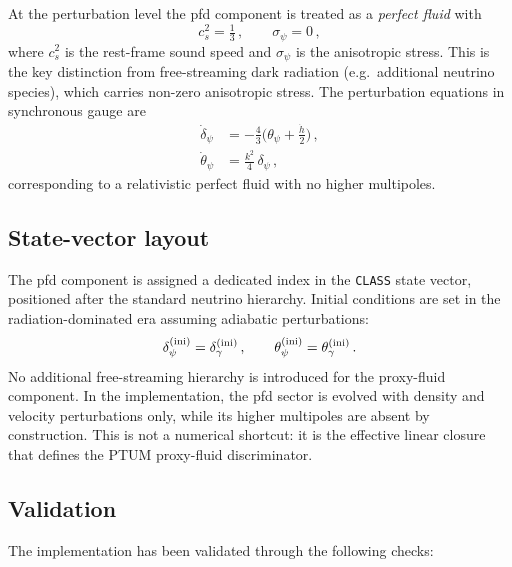 \documentclass[epj]{svjour}
\begin{document}
At the perturbation level the pfd component is treated as a
\emph{perfect fluid} with
\begin{equation}
c_s^2 = \tfrac{1}{3}\,,\qquad \sigma_\psi = 0\,,
\label{eq:pfd_pert_app}
\end{equation}
where $c_s^2$ is the rest-frame sound speed and $\sigma_\psi$ is
the anisotropic stress. This is the key distinction from
free-streaming dark radiation (e.g.\ additional neutrino species),
which carries non-zero anisotropic stress. The perturbation
equations in synchronous gauge are
\begin{align}
\dot{\delta}_\psi
  &= -\tfrac{4}{3}\bigl(\theta_\psi+\tfrac{\dot{h}}{2}\bigr)\,,
\label{eq:delta_pfd_app}\\[4pt]
\dot{\theta}_\psi
  &= \tfrac{k^2}{4}\,\delta_\psi\,,
\label{eq:theta_pfd_app}
\end{align}
corresponding to a relativistic perfect fluid with no higher
multipoles.

\subsection{State-vector layout}

The pfd component is assigned a dedicated index in the
\texttt{CLASS} state vector, positioned after the standard
neutrino hierarchy. Initial conditions are set in the
radiation-dominated era assuming adiabatic perturbations:
\begin{equation}
\delta_\psi^{(\rm ini)} = \delta_\gamma^{(\rm ini)}\,,
\qquad
\theta_\psi^{(\rm ini)} = \theta_\gamma^{(\rm ini)}\,.
\end{equation}
No additional free-streaming hierarchy is introduced for the proxy-fluid
component. In the implementation, the pfd sector is evolved with density and
velocity perturbations only, while its higher multipoles are absent by
construction. This is not a numerical shortcut: it is the effective linear
closure that defines the PTUM proxy-fluid discriminator.

\subsection{Validation}

The implementation has been validated through the following checks:
\end{document}
